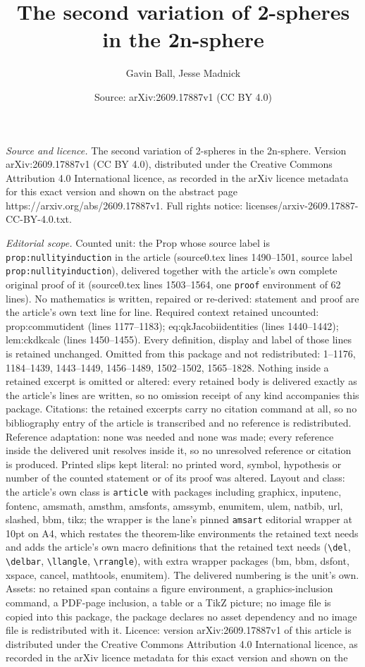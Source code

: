 \documentclass[10pt,a4paper]{amsart}
\title[The second variation of 2-spheres in the 2n-sphere]{The second variation of 2-spheres in the 2n-sphere}
\author{Gavin Ball, Jesse Madnick}
\date{Source: arXiv:2609.17887v1 (CC BY 4.0)}
\begin{document}
\maketitle

\noindent\emph{Source and licence.} The second variation of 2-spheres in the 2n-sphere. Version arXiv:2609.17887v1 (CC BY 4.0), distributed under the Creative Commons Attribution 4.0 International licence, as recorded in the arXiv licence metadata for this exact version and shown on the abstract page https://arxiv.org/abs/2609.17887v1. Full rights notice: licenses/arxiv-2609.17887-CC-BY-4.0.txt.\par\smallskip

\noindent\textit{Editorial scope.} Counted unit: the Prop whose source label is \texttt{prop:nullityinduction} in the article (source0.tex lines 1490--1501, source label \texttt{prop:nullityinduction}), delivered together with the article's own complete original proof of it (source0.tex lines 1503--1564, one \texttt{proof} environment of 62 lines). No mathematics is written, repaired or re-derived: statement and proof are the article's own text line for line. Required context retained uncounted: prop:commutident (lines 1177--1183); eq:qkJacobiidentities (lines 1440--1442); lem:ckdkcalc (lines 1450--1455). Every definition, display and label of those lines is retained unchanged. Omitted from this package and not redistributed: 1--1176, 1184--1439, 1443--1449, 1456--1489, 1502--1502, 1565--1828. Nothing inside a retained excerpt is omitted or altered: every retained body is delivered exactly as the article's lines are written, so no omission receipt of any kind accompanies this package. Citations: the retained excerpts carry no citation command at all, so no bibliography entry of the article is transcribed and no reference is redistributed. Reference adaptation: none was needed and none was made; every reference inside the delivered unit resolves inside it, so no unresolved reference or citation is produced. Printed slips kept literal: no printed word, symbol, hypothesis or number of the counted statement or of its proof was altered. Layout and class: the article's own class is \texttt{article} with packages including graphicx, inputenc, fontenc, amsmath, amsthm, amsfonts, amssymb, enumitem, ulem, natbib, url, slashed, bbm, tikz; the wrapper is the lane's pinned \texttt{amsart} editorial wrapper at 10pt on A4, which restates the theorem-like environments the retained text needs and adds the article's own macro definitions that the retained text needs (\texttt{\textbackslash del}, \texttt{\textbackslash delbar}, \texttt{\textbackslash llangle}, \texttt{\textbackslash rrangle}), with extra wrapper packages (bm, bbm, dsfont, xspace, cancel, mathtools, enumitem). The delivered numbering is the unit's own. Assets: no retained span contains a figure environment, a graphics-inclusion command, a PDF-page inclusion, a table or a TikZ picture; no image file is copied into this package, the package declares no asset dependency and no image file is redistributed with it. Licence: version arXiv:2609.17887v1 of this article is distributed under the Creative Commons Attribution 4.0 International licence, as recorded in the arXiv licence metadata for this exact version and shown on the 
\end{document}
